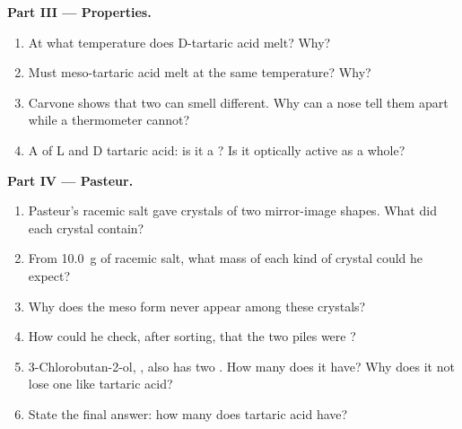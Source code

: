 \begin{problem}
\medskip
\noindent\textbf{Part III --- Properties.}
\begin{enumerate}[resume]
  \item At what temperature does D-tartaric acid melt? Why?
  \item Must meso-tartaric acid melt at the same temperature? Why?
  \item Carvone shows that two  can smell different. Why can
        a nose tell them apart while a thermometer cannot?
  \item A  of L and D tartaric acid: is it a ? Is it optically active as a whole?
\end{enumerate}

\medskip
\noindent\textbf{Part IV --- Pasteur.}
\begin{enumerate}[resume]
  \item Pasteur's racemic salt gave crystals of two mirror-image shapes.
        What did each crystal contain?
  \item From \qty{10.0}{g} of racemic salt, what mass of each kind of
        crystal could he expect?
  \item Why does the meso form never appear among these crystals?
  \item How could he check, after sorting, that the two piles were
        ?
  \item 3-Chlorobutan-2-ol, , also has two
        . How many  does it have? Why does
        it not lose one like tartaric acid?
  \item State the final answer: how many  does tartaric acid
        have?
\end{enumerate}
\end{problem}
